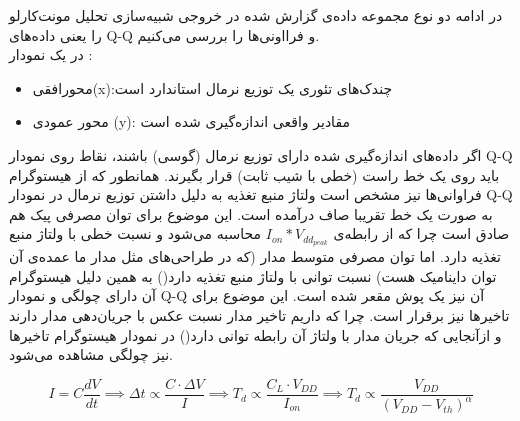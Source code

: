 در ادامه دو نوع مجموعه داده‌ی گزارش شده در خروجی شبیه‌سازی تحلیل مونت‌کارلو را یعنی داده‌های Q-Q و فرااونی‌ها را بررسی می‌کنیم. \\
در یک نمودار :
\begin{itemize}
    \setlength{\itemsep}{1pt}
    \setlength{\parskip}{0pt}
    \setlength{\parsep}{0pt}
    \item محورافقی(x):چندک‌های تئوری یک توزیع نرمال استاندارد است
    \item محور عمودی (y): مقادیر واقعی اندازه‌گیری شده است
\end{itemize}
اگر داده‌های اندازه‌گیری شده دارای توزیع نرمال (گوسی) باشند، نقاط روی نمودار Q-Q باید روی یک خط راست (خطی با شیب ثابت) قرار بگیرند.
همانطور که از هیستوگرام فراوانی‌ها نیز مشخص است ولتاژ منبع تغذیه به دلیل داشتن توزیع نرمال در نمودار Q-Q به صورت یک خط تقریبا صاف درآمده است.
این موضوع برای توان مصرفی پیک هم صادق است چرا که از رابطه‌ی $I_{on} * V_{dd_{peak}}$ محاسبه می‌شود و نسبت خطی با ولتاژ منبع تغذیه دارد.
اما توان مصرفی متوسط مدار (که در طراحی‌های  مثل مدار ما عمده‌ی آن توان داینامیک هست) نسبت توانی با ولتاژ منبع تغذیه دارد() به ‌همین دلیل هیستوگرام آن دارای چولگی و نمودار Q-Q آن نیز یک پوش مقعر شده است.
این موضوع برای تاخیر‌ها نیز برقرار است. 
چرا که داریم تاخیر مدار نسبت عکس با جریان‌دهی مدار دارند و ازآنجایی که جریان مدار با ولتاژ آن رابطه توانی دارد() در نمودار هیستوگرام تاخیر‌ها نیز چولگی مشاهده می‌شود.

$$I = C \frac{dV}{dt} \implies \Delta t \propto \frac{C \cdot \Delta V}{I} \implies T_d \propto \frac{C_L \cdot V_{DD}}{I_{on}} \implies T_d \propto \frac{V_{DD}}{(V_{DD} - V_{th})^\alpha}$$

\newpage


